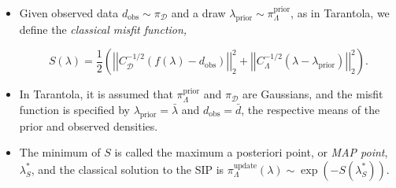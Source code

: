 \documentclass[11pt]{beamer}
\begin{document}
\begin{frame}

\begin{itemize}
	
	\item Given observed data $d_{\text{obs}} \sim \pi_\mathcal{D}$ and a draw $\lambda_\text{prior}\sim \pi_\Lambda^\text{prior}$, as in Tarantola, we define the \textit{classical misfit function,}


\begin{equation} \label{eq:2}
S(\lambda)=\frac{1}{2}\left(\left|\left|C_\mathcal{D}^{-1/2}(f(\lambda)-d_{\text{obs}})\right|\right|_2^2+\left|\left|C_\Lambda^{-1/2}(\lambda-\lambda_{\text{prior}})\right|\right|_2^2\right).
\end{equation} 

\item In Tarantola, it is assumed that $\pi_\Lambda^\text{prior}$ and $\pi_\mathcal{D}$ are Gaussians, and the misfit function is specified by $\lambda_{\text{prior}}=\bar{\lambda}$ and $d_{\text{obs}}=\bar{d}$, the respective means of the prior and observed densities.

\item The minimum of $S$ is called the maximum a posteriori point, or \textit{MAP point}, $\lambda_S^*$, and the classical solution to the SIP is $\pi_\Lambda^\text{update}(\lambda) \sim \exp(-S(\lambda_S^*)).$ 


\end{itemize}


\end{frame}
\end{document}
